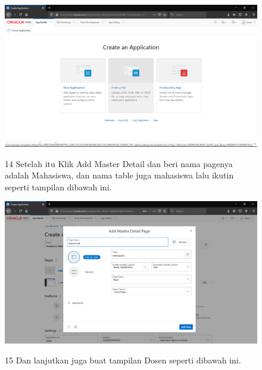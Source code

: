 \begin{enumerate}
\begin{figure}
    \begin{center}
\includegraphics[scale=0.2]{figures/2.png}
    \caption{\textit{}}
        \end{center}
\label{gambar}
\end{figure}


\begin{figure}
\item[14]Setelah itu Klik Add Master Detail dan beri nama pagenya adalah Mahasiswa, dan nama table juga mahasiswa lalu ikutin seperti tampilan dibawah ini.

    \begin{center}
\includegraphics[scale=0.2]{figures/28.png}
    \caption{\textit{}}
        \end{center}
\label{gambar}
\end{figure}


\begin{figure}
\item[15]Dan lanjutkan juga buat tampilan Dosen seperti dibawah ini.


\end{figure}
\end{enumerate}
